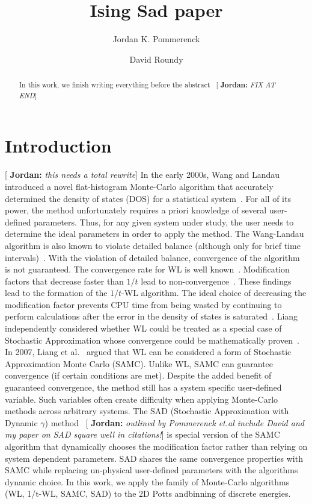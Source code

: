 \documentclass[letterpaper,twocolumn,amsmath,amssymb,pre,aps,10pt]{revtex4-1}
\newcommand{\blue}[1]{{\bf \color{blue} #1}}
\newcommand{\jpsays}[1]{{\color{red} [\blue{Jordan:} \emph{#1}]}}
\begin{document}
\title{Ising Sad paper
}

\author{Jordan K. Pommerenck} \author{David Roundy}

\begin{abstract}
In this work, we finish writing everything before the abstract~\jpsays{FIX AT END}
\end{abstract}

\maketitle

\section{Introduction}
\jpsays{this needs a total rewrite}
In the early 2000s, Wang and Landau introduced a novel flat-histogram
Monte-Carlo algorithm that accurately determined the density of states
(DOS) for a statistical
system~\cite{wang2001determining,wang2001efficient}. For all of its
power, the method unfortunately requires a priori knowledge of several
user-defined parameters. Thus, for any given system under study, the
user needs to determine the ideal parameters in order to apply the
method. The Wang-Landau algorithm is also known to violate detailed
balance (although only for brief time intervals)~\cite{yan2003fast,
shell2002generalization}. With the violation of detailed balance,
convergence of the algorithm is not guaranteed. The convergence rate
for WL is well known~\cite{zhou2005understanding,lee2006convergence,
belardinelli2007wang}. Modification factors that decrease faster than
$1/t$ lead to non-convergence~\cite{belardinelli2007fast}.  These
findings lead to the formation of the $1/t$-WL algorithm.  The ideal
choice of decreasing the modification factor prevents CPU time from
being wasted by continuing to perform calculations after the error in
the density of states is saturated~\cite{belardinelli2008analysis}.
Liang independently considered whether WL could be treated as a special
case of Stochastic Approximation whose convergence could be
mathematically proven~\cite{liang2006theory, liang2007stochastic}. In
2007, Liang et al.~\cite{liang2007stochastic} argued that WL can be
considered a form of Stochastic Approximation Monte Carlo (SAMC).
Unlike WL, SAMC can guarantee convergence (if certain conditions are
met). Despite the added benefit of guaranteed convergence, the method
still has a system specific user-defined variable. Such variables often
create difficulty when applying Monte-Carlo methods across arbitrary
systems.  The SAD (Stochastic Approximation with Dynamic $\gamma$)
method~\jpsays{outlined by Pommerenck et.al include David and my paper
on SAD square well in citations!} is special version of the SAMC
algorithm that dynamically chooses the modification factor rather than
relying on system dependent parameters. SAD shares the same convergence
properties with SAMC while replacing un-physical user-defined parameters
with the algorithms dynamic choice.  In this work, we apply the family
of Monte-Carlo algorithms (WL, 1/t-WL, SAMC, SAD) to the 2D Potts andbinning of discrete energies.
\end{document}
